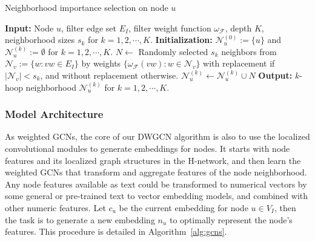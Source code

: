 \documentclass[manuscript,screen,review]{acmart}
\newcommand\Fcal{\mathcal{F}}
\newcommand{\Ncal}{\mathcal{N}}
\begin{document}
\vspace{-0.5em}
\begin{algorithm}[ht]
\caption{Neighborhood importance selection on node $u$}
\label{alg:nodes}
\begin{algorithmic}[1]
\STATE \textbf{Input:} Node $u$, filter edge set $E_I$, filter weight function $\omega_{\Fcal}$, depth $K$, neighborhood sizes $s_k$ for $k=1,2,\cdots,K$.
\STATE \textbf{Initialization:} $\Ncal_u^{(0)}:=\{u\}$ and $\Ncal_u^{(k)}:=\emptyset$ for $k=1,2,\cdots,K$.
\FOR{$v\in \Ncal_u^{(k-1)}$}
\STATE $N\leftarrow$ Randomly selected $s_k$ neighbors from $\Ncal_v:=\{w: vw\in E_I\}$ by weights $\{\omega_{\Fcal}(vw): w\in\Ncal_v\}$ with replacement if $|\Ncal_v|<s_k$, and without replacement otherwise.
\STATE $\Ncal_u^{(k)}\leftarrow \Ncal_u^{(k)}\cup N$
\ENDFOR
\ENDFOR
\STATE 
\textbf{Output:} $k$-hoop neighborhood $\Ncal_u^{(k)}$ for $k=1,2,\cdots,K$.
\end{algorithmic}
\end{algorithm}
\vspace{-1em}


\subsubsection{Model Architecture}
As weighted GCNs, the core of our DWGCN algorithm is also to use the localized convolutional modules to generate embeddings for nodes. It starts with node features and its localized graph structures in the H-network, and then learn the weighted GCNs that transform and aggregate features of the node neighborhood. 
Any node features available as text could be transformed to numerical vectors by some general or pre-trained text to vector embedding models, and combined with other numeric features. 
Let $c_u$ be the current embedding for node $u\in V_I$, then the task is to generate a new embedding $n_u$ to optimally represent the node's features. This procedure is detailed in Algorithm~\ref{alg:gcns}.
\end{document}
